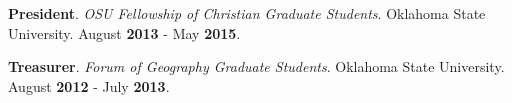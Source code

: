 \begin{cventries}
  \cventry
    {}
    {}
    {}
    {}
    {
       \begin{cvitems}
          \vspace{-3mm}
        \item {\textbf{President}. \textit{OSU Fellowship of Christian Graduate
              Students}. Oklahoma State University. August \textbf{2013} -
            May \textbf{2015}.} 
          \end{cvitems}
          }

  \cventry
    {}
    {}
    {}
    {}
    {
       \begin{cvitems}
          \vspace{-3mm}
        \item {\textbf{Treasurer}. \textit{Forum of Geography Graduate
              Students}. Oklahoma State University. August \textbf{2012} - July
            \textbf{2013}. }
          \end{cvitems}
          }
\end{cventries}
